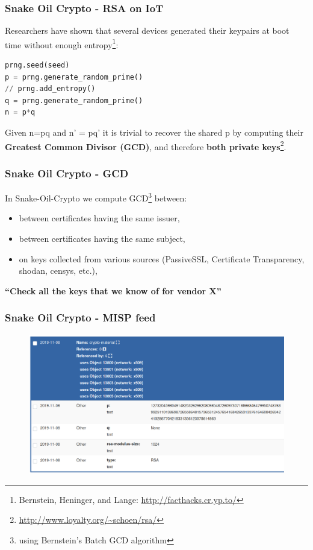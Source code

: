 \documentclass{beamer}
\begin{document}
\begin{frame}[fragile]
   \frametitle{Snake Oil Crypto - RSA on IoT }
   Researchers have shown that several devices generated their keypairs
   at boot time without enough entropy\footnote{Bernstein, Heninger, and Lange: \url{http://facthacks.cr.yp.to/}}:
   
\begin{lstlisting}[frame=single, language=python]
prng.seed(seed)
p = prng.generate_random_prime()
// prng.add_entropy()
q = prng.generate_random_prime()
n = p*q
\end{lstlisting}

Given n=pq and n' = pq' it is trivial to recover the shared p by computing their
{\bf Greatest Common Divisor (GCD)}, and therefore {\bf both private keys}\footnote{\url{http://www.loyalty.org/~schoen/rsa/}}.

\end{frame}

\begin{frame}
   \frametitle{Snake Oil Crypto - GCD}
   In Snake-Oil-Crypto we compute GCD\footnote{using Bernstein's Batch GCD algorithm} between:
   
   \begin{itemize}
     \item between certificates having the same issuer,
     \item between certificates having the same subject,
     \item on keys collected from various sources (PassiveSSL, Certificate Transparency,
       shodan, censys, etc.),
   \end{itemize}

\vspace{10 mm}
  {\bf ``Check all the keys that we know of for vendor X''}

\end{frame}

\begin{frame}
   \frametitle{Snake Oil Crypto - MISP feed}
\begin{figure}
\centering
\includegraphics[width=\textwidth]{misp.png}
\end{figure}

\end{frame}
\end{document}
